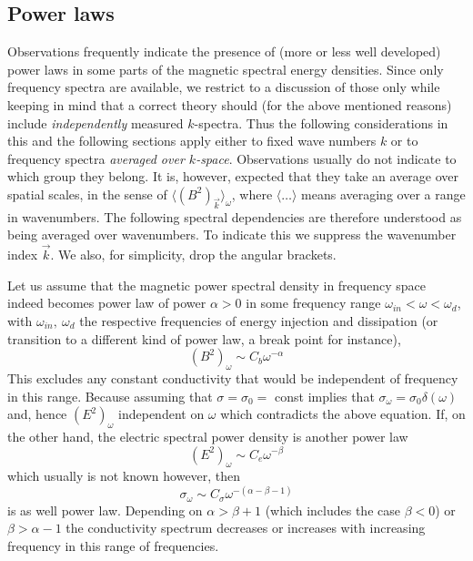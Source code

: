 \documentclass[ ]{copernicus2}
\begin{document}
{{\subsection{Power laws}
Observations frequently indicate the presence of (more or less well developed) power laws in some parts of the magnetic spectral energy densities. {Since only frequency spectra are available, we restrict to a discussion of those only while keeping in mind that a correct theory should (for the above mentioned reasons) include \emph{independently} measured $k$-spectra. Thus the following considerations in this and the following sections apply either to fixed wave numbers $k$ or to frequency spectra \emph{averaged over $k$-space}. Observations usually do not indicate to which group they belong. It is, however, expected that they take an average over spatial scales, in the sense of $\langle (B^2)_{\vec{k}}\rangle_\omega$, where $\langle\dots\rangle$ means averaging over a range in wavenumbers. The following spectral dependencies are therefore understood as being averaged over wavenumbers. To indicate this we suppress the wavenumber index $\vec{k}$. We also, for simplicity, drop the angular brackets. }

 Let us assume that the magnetic power spectral density in frequency space indeed becomes power law of power $\alpha>0$ in some frequency range $\omega_{in}<\omega<\omega_d$, with $\omega_{in},\ \omega_d$ the respective frequencies of energy injection and dissipation (or transition to a different kind of power law, a break point for instance),
\begin{equation}
(B^2)_\omega\sim C_b\omega^{-\alpha}
\end{equation}
This excludes any constant conductivity that would be independent of frequency in this range. Because assuming that $\sigma=\sigma_0=$ const implies that $\sigma_\omega=\sigma_0\delta(\omega)$ and, hence $(E^2)_\omega$ independent on $\omega$ which contradicts the above equation.  {If, on the other hand, the electric spectral power density is another power law
\begin{equation}
(E^2)_\omega\sim C_e\omega^{-\beta}
\end{equation}
which usually is not known however, then 
\begin{equation}\label{eq-sig-2}
\sigma_\omega\sim C_\sigma\omega^{-(\alpha-\beta-1)}
\end{equation}
is as well power law. Depending on $\alpha>\beta+1$ (which includes the case $\beta<0$) or $\beta>\alpha-1$ the conductivity spectrum decreases or increases with increasing frequency in this range of frequencies.} 

}}
\end{document}
